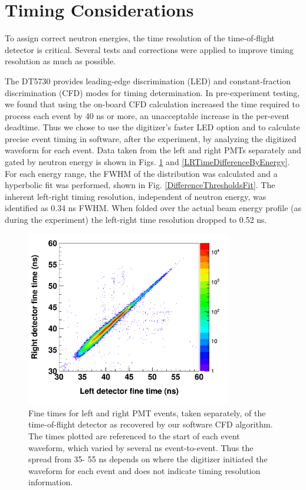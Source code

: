 \section{Timing Considerations}
To assign correct neutron energies, the time resolution of the time-of-flight
detector is critical. Several tests and corrections were applied to improve
timing resolution as much as possible.

The DT5730 provides leading-edge discrimination (LED) and constant-fraction discrimination
(CFD) modes for timing determination. In pre-experiment testing, we found that using the
on-board CFD calculation increased the time required to process each event by 40
ns or more, an unacceptable increase in the per-event deadtime. Thus we chose
to use the digitizer's faster LED option and to calculate precise event timing
in software, after the experiment, by analyzing the digitized waveform for each event.
Data taken from the left and right PMTs separately and gated by neutron energy 
is shown in Figs. \ref{LRCorrelation} and \ref{LRTimeDifferenceByEnergy}. 
For each energy range, the FWHM of the distribution was calculated and a hyperbolic fit was
performed, shown in Fig. \ref{DifferenceThresholdsFit}. The inherent left-right timing 
resolution, independent of neutron energy, was identified as 0.34 ns FWHM.
When folded over the actual beam energy profile (as during the experiment)
the left-right time resolution dropped to 0.52 ns.

\begin{figure}[h]
    \centering
    \includegraphics[width=0.8\textwidth]{figures/LRCorrelation.png}
    \caption[Event times for left and right PMTs of time-of-flight detector]
    {Fine times for left and right PMT events, taken separately, of the time-of-flight 
        detector as recovered by our software CFD algorithm. The times plotted are referenced
        to the start of each event waveform, which varied by several ns event-to-event.
        Thus the spread from 35-
        55 ns depends on where the digitizer initiated the waveform for each
        event and does not indicate timing resolution information.}
    \label{LRCorrelation}
\end{figure}


